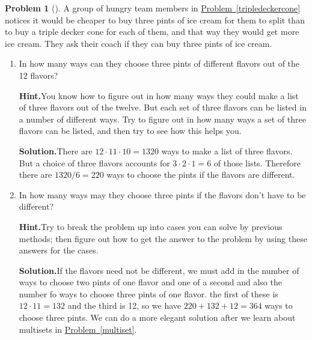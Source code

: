 \documentclass[10pt,]{book}
\theoremstyle{plain}
\theoremstyle{definition}
\newtheorem{activity}[project]{Problem}
\theoremstyle{definition}
\numberwithin{equation}{chapter}
\begin{document}
\begin{activity}[]\label{icecreaminpints}
A group of hungry team members in \hyperref[tripledeckercone]{Problem~\ref{tripledeckercone}} notices it would be cheaper to buy three pints of ice cream for them to split than to buy a triple decker cone for each of them, and that way they would get more ice cream. They ask their coach if they can buy three pints of ice cream.%
\begin{enumerate}[font=\bfseries,label=(\alph*),ref=\alph*]
\item\label{task-11} In how many ways can they choose three pints of different flavors out of the 12 flavors?%
\par\medskip\noindent%
\textbf{Hint.}\quad You know how to figure out in how many ways they could make a list of three flavors out of the twelve. But each set of three flavors can be listed in a number of different ways. Try to figure out in how many ways a set of three flavors can be listed, and then try to see how this helps you.%
\par\medskip\noindent%
\textbf{Solution.}\quad There are \(12\cdot11\cdot 10 = 1320\) ways to make a list of three flavors. But a choice of three flavors accounts for \(3\cdot2\cdot1 = 6\) of those lists. Therefore there are \(1320/6=220\) ways to choose the pints if the flavors are different.%
\item\label{task-12} In how many ways may they choose three pints if the flavors don't have to be different?%
\par\medskip\noindent%
\textbf{Hint.}\quad Try to break the problem up into cases you can solve by previous methods; then figure out how to get the answer to the problem by using these answers for the cases.%
\par\medskip\noindent%
\textbf{Solution.}\quad If the flavors need not be different, we must add in the number of ways to choose two pints of one flavor and one of a second and also the number fo ways to choose three pints of one flavor. the first of these is \(12\cdot11
=132\) and the third is 12, so we have \(220+132+12=364\) ways to choose three pints. We can do a more elegant solution after we learn about multisets in \hyperref[multiset]{Problem~\ref{multiset}}.%
\end{enumerate}
\end{activity}
\end{document}
